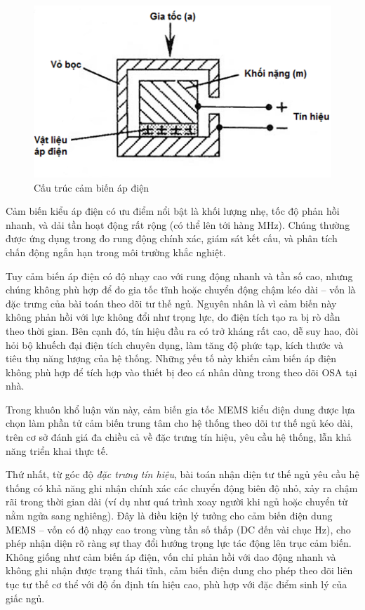 \begin{enumerate}
        \begin{figure}[H]
          \centering
          \includegraphics[width=\textwidth]{images/acce_apdien.png}
          \vspace*{-7mm}
          \caption{Cấu trúc cảm biến áp điện}
          \label{acce_apdien}
        \end{figure}

        Cảm biến kiểu áp điện có ưu điểm nổi bật là khối lượng nhẹ, tốc độ phản hồi
        nhanh, và dải tần hoạt động rất rộng (có thể lên tới hàng MHz). Chúng thường
        được ứng dụng trong đo rung động chính xác, giám sát kết cấu, và phân tích chấn
        động ngắn hạn trong môi trường khắc nghiệt.

        Tuy cảm biến áp điện có độ nhạy cao với rung động nhanh và tần số cao, nhưng
        chúng không phù hợp để đo gia tốc tĩnh hoặc chuyển động chậm kéo dài – vốn là
        đặc trưng của bài toán theo dõi tư thế ngủ. Nguyên nhân là vì cảm biến này
        không phản hồi với lực không đổi như trọng lực, do điện tích tạo ra bị rò dần
        theo thời gian. Bên cạnh đó, tín hiệu đầu ra có trở kháng rất cao, dễ suy hao,
        đòi hỏi bộ khuếch đại điện tích chuyên dụng, làm tăng độ phức tạp, kích thước
        và tiêu thụ năng lượng của hệ thống. Những yếu tố này khiến cảm biến áp điện
        không phù hợp để tích hợp vào thiết bị đeo cá nhân dùng trong theo dõi OSA tại
        nhà.
\end{enumerate}

Trong khuôn khổ luận văn này, cảm biến gia tốc MEMS kiểu điện dung được lựa
chọn làm phần tử cảm biến trung tâm cho hệ thống theo dõi tư thế ngủ kéo dài,
trên cơ sở đánh giá đa chiều cả về đặc trưng tín hiệu, yêu cầu hệ thống, lẫn
khả năng triển khai thực tế.

Thứ nhất, từ góc độ \textit{đặc trưng tín hiệu}, bài toán nhận diện tư thế ngủ
yêu cầu hệ thống có khả năng ghi nhận chính xác các chuyển động biên độ nhỏ,
xảy ra chậm rãi trong thời gian dài (ví dụ như quá trình xoay người khi ngủ
hoặc chuyển từ nằm ngửa sang nghiêng). Đây là điều kiện lý tưởng cho cảm biến
điện dung MEMS – vốn có độ nhạy cao trong vùng tần số thấp (DC đến vài chục
Hz), cho phép nhận diện rõ ràng sự thay đổi hướng trọng lực tác động lên trục
cảm biến. Không giống như cảm biến áp điện, vốn chỉ phản hồi với dao động nhanh
và không ghi nhận được trạng thái tĩnh, cảm biến điện dung cho phép theo dõi
liên tục tư thế cơ thể với độ ổn định tín hiệu cao, phù hợp với đặc điểm sinh
lý của giấc ngủ.

